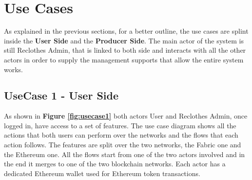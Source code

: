 \clearpage
\section{Use Cases}
\label{use-cases}

As explained in the previous sections, for a better outline, the use cases are splint inside the 
\textbf{User Side} and the \textbf{Producer Side}. The main actor of the system is still Reclothes Admin, 
that is linked to both side and interacts with all the other actors in order to supply the management 
supports that allow the entire system works.

\subsection{UseCase 1 - User Side}

As shown in \textbf{Figure \ref{fig:usecase1}} both actors User and Reclothes Admin, once logged in, have access to a set
of features. The use case diagram shows all the actions that both users can perform over the networks and
the flows that each action follows. The features are split over the two networks, the Fabric one and the 
Ethereum one. All the flows start from one of the two actors involved and in the end it merges to one 
of the two blockchain networks. Each actor has a dedicated Ethereum wallet used for Ethereum token
transactions. 
\bigskip

